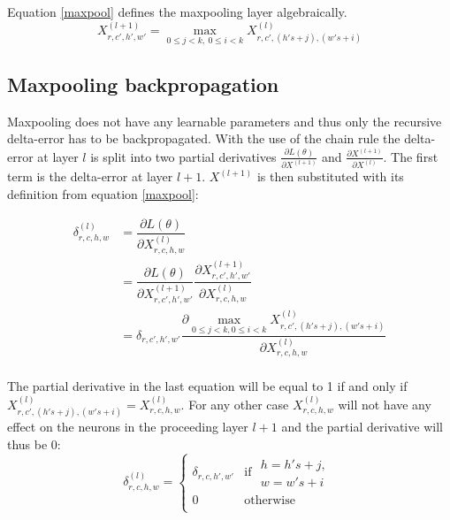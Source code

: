 \documentclass[a4paper, twoside]{article}
\newcommand*{\pd}[2]{\ensuremath{\dfrac{\partial #1}{\partial #2}}}
\newcommand*{\inpd}[2]{\ensuremath{\frac{\partial #1}{\partial #2}}}
\begin{document}
Equation \eqref{maxpool} defines the maxpooling layer algebraically. \cite{cs231n} \cite{convmath}
\begin{equation}\label{maxpool}
X^{(l+1)}_{r,c',h',w'} = \underset{0 \leq j < k, \ 0 \leq i < k}{\max} X^{(l)}_{r,c',(h's+j),(w's+i)}
\end{equation}

\subsection{Maxpooling backpropagation}
Maxpooling does not have any learnable parameters and thus only the recursive delta-error has to be backpropagated. With the use of the chain rule the delta-error at layer $l$ is split into two partial derivatives $\inpd{L(\theta)}{X^{(l+1)}}$ and $\inpd{X^{(l+1)}}{X^{(l)}}$. The first term is the delta-error at layer $l+1$. $X^{(l+1)}$ is then substituted with its definition from equation \eqref{maxpool}: \cite{cs231n} \cite{convmath} \cite{webconv3}

\begin{equation}
\begin{split}
	\delta^{(l)}_{r,c,h,w}
		& = \pd{L(\theta)}{X^{(l)}_{r,c,h,w}} \\
		& = \pd{L(\theta)}{X^{(l+1)}_{r,c',h',w'}} \pd{X^{(l+1)}_{r,c',h',w'}}{X^{(l)}_{r,c,h,w}} \\
		& = \delta_{r,c',h',w'} \pd{\underset{0 \leq j < k,0 \leq i < k}{\max} X^{(l)}_{r,c',(h's+j),(w's+i)}}{X^{(l)}_{r,c,h,w}} \\
\end{split}
\end{equation}

The partial derivative in the last equation will be equal to 1 if and only if $X^{(l)}_{r,c',(h's+j),(w's+i)} = X^{(l)}_{r,c,h,w}$. For any other case $X^{(l)}_{r,c,h,w}$ will not have any effect on the neurons in the proceeding layer $l+1$ and the partial derivative will thus be 0:\cite{cs231n} \cite{convmath} \cite{webconv3}
\begin{equation}
\delta^{(l)}_{r,c,h,w} = \begin{cases}
				\delta_{r,c,h',w'} & \mbox{if } \begin{split} h = h's+j, \\w = w's+i \end{split}\\
				0 & \mbox{otherwise}\\
			\end{cases}
\end{equation}
\end{document}
